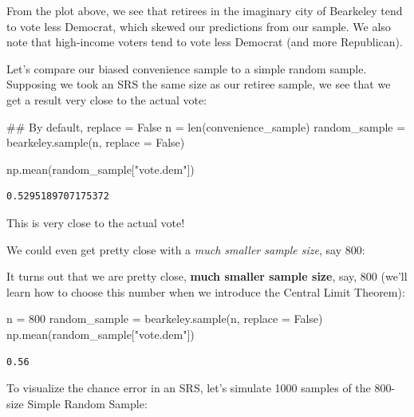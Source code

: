 \documentclass[
  letterpaper,
  DIV=11,
  numbers=noendperiod]{scrreprt}
\newenvironment{Shaded}{\begin{snugshade}}{\end{snugshade}}
\newcommand{\BuiltInTok}[1]{\textcolor[rgb]{0.00,0.23,0.31}{#1}}
\newcommand{\CommentTok}[1]{\textcolor[rgb]{0.37,0.37,0.37}{#1}}
\newcommand{\DecValTok}[1]{\textcolor[rgb]{0.68,0.00,0.00}{#1}}
\newcommand{\NormalTok}[1]{\textcolor[rgb]{0.00,0.23,0.31}{#1}}
\newcommand{\OperatorTok}[1]{\textcolor[rgb]{0.37,0.37,0.37}{#1}}
\newcommand{\StringTok}[1]{\textcolor[rgb]{0.13,0.47,0.30}{#1}}
\newcommand{\VariableTok}[1]{\textcolor[rgb]{0.07,0.07,0.07}{#1}}
\begin{document}
From the plot above, we see that retirees in the imaginary city of
Bearkeley tend to vote less Democrat, which skewed our predictions from
our sample. We also note that high-income voters tend to vote less
Democrat (and more Republican).

Let's compare our biased convenience sample to a simple random sample.
Supposing we took an SRS the same size as our retiree sample, we see
that we get a result very close to the actual vote:

\begin{Shaded}
\begin{Highlighting}[]
\CommentTok{\#\# By default, replace = False}
\NormalTok{n }\OperatorTok{=} \BuiltInTok{len}\NormalTok{(convenience\_sample)}
\NormalTok{random\_sample }\OperatorTok{=}\NormalTok{ bearkeley.sample(n, replace }\OperatorTok{=} \VariableTok{False}\NormalTok{)}

\NormalTok{np.mean(random\_sample[}\StringTok{"vote.dem"}\NormalTok{])}
\end{Highlighting}
\end{Shaded}

\begin{verbatim}
0.5295189707175372
\end{verbatim}

This is very close to the actual vote!

We could even get pretty close with a \emph{much smaller sample size},
say 800:

It turns out that we are pretty close, \textbf{much smaller sample
size}, say, 800 (we'll learn how to choose this number when we introduce
the Central Limit Theorem):

\begin{Shaded}
\begin{Highlighting}[]
\NormalTok{n }\OperatorTok{=} \DecValTok{800}
\NormalTok{random\_sample }\OperatorTok{=}\NormalTok{ bearkeley.sample(n, replace }\OperatorTok{=} \VariableTok{False}\NormalTok{)}
\NormalTok{np.mean(random\_sample[}\StringTok{"vote.dem"}\NormalTok{])}
\end{Highlighting}
\end{Shaded}

\begin{verbatim}
0.56
\end{verbatim}

To visualize the chance error in an SRS, let's simulate 1000 samples of
the 800-size Simple Random Sample:
\end{document}
